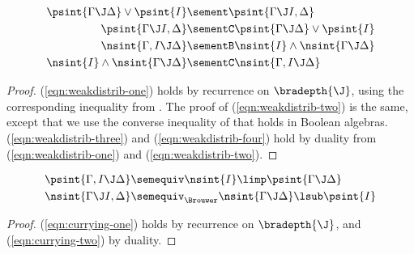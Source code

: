 \begin{lemma}
  \begin{align}
    \psint{\Gamma \J \Delta} \lor \psint{I} &\sement \psint{\Gamma \J I, \Delta} \label{eqn:weakdistrib-one} \\
    \psint{\Gamma \J I, \Delta} &\sementC \psint{\Gamma \J \Delta} \lor \psint{I} \label{eqn:weakdistrib-two} \\
    \nsint{\Gamma, I \J \Delta} &\sementB \nsint{I} \land \nsint{\Gamma \J \Delta} \label{eqn:weakdistrib-three} \\
    \nsint{I} \land \nsint{\Gamma \J \Delta} &\sementC \nsint{\Gamma, I \J \Delta} \label{eqn:weakdistrib-four}
  \end{align}
\end{lemma}
\begin{proof}
  (\ref{eqn:weakdistrib-one}) holds by recurrence on $\bradepth{\J}$, using the
  corresponding inequality from . The proof of
  (\ref{eqn:weakdistrib-two}) is the same, except that we use the converse
  inequality of  that holds in Boolean algebras.
  (\ref{eqn:weakdistrib-three}) and (\ref{eqn:weakdistrib-four}) hold by duality
  from (\ref{eqn:weakdistrib-one}) and (\ref{eqn:weakdistrib-two}).
\end{proof}

\begin{lemma}
  \begin{align}
    \psint{\Gamma, I \J \Delta} &\semequiv \nsint{I} \limp \psint{\Gamma \J \Delta} \label{eqn:currying-one} \\
    \nsint{\Gamma \J I, \Delta} &\semequiv_{\Brouwer} \nsint{\Gamma \J \Delta} \lsub \psint{I} \label{eqn:currying-two}
  \end{align}
\end{lemma}
\begin{proof}
  (\ref{eqn:currying-one}) holds by recurrence on $\bradepth{\J}$, and
  (\ref{eqn:currying-two}) by duality.
\end{proof}



